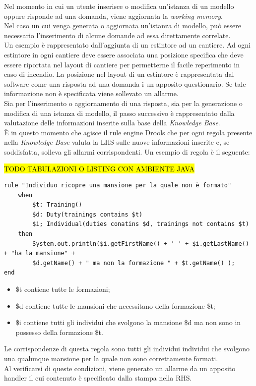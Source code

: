 Nel momento in cui un utente inserisce o modifica un'istanza di un modello oppure risponde ad una domanda, viene aggiornata la \textit{working memory}. \\
Nel caso un cui venga generata o aggiornata un'istanza di modello, può essere necessario l'inserimento di alcune domande ad essa direttamente correlate.\\
Un esempio è rappresentato dall'aggiunta di un estintore ad un cantiere. Ad ogni estintore in ogni cantiere deve essere associata una posizione specifica che deve essere riportata nel layout di cantiere per permetterne il facile reperimento in caso di incendio. La posizione nel layout di un estintore è rappresentata dal software come una risposta ad una domanda i un apposito questionario. Se tale informazione non è specificata viene sollevato un allarme.\\
Sia per l'inserimento o aggiornamento di una risposta, sia per la generazione o modifica di una istanza di modello, il passo successivo è rappresentato dalla valutazione delle informazioni inserite sulla base della \textit{Knowledge Base}. \\
È in questo momento che agisce il rule engine Drools che per ogni regola presente nella \textit{Knowledge Base} valuta la LHS sulle nuove informazioni inserite e, se soddisfatta, solleva gli allarmi corrispondenti. 
Un esempio di regola è il seguente:

\hl{TODO TABULAZIONI O LISTING CON AMBIENTE JAVA}
\begin{verbatim}
rule "Individuo ricopre una mansione per la quale non è formato"
	when
		$t: Training()
		$d: Duty(trainings contains $t)
		$i; Individual(duties conatins $d, trainings not contains $t)
	then
		System.out.println($i.getFirstName() + ' ' + $i.getLastName() + "ha la mansione" +
		$d.getName() + " ma non la formazione " + $t.getName() );
end
\end{verbatim}
\begin{itemize}
	\item \$t contiene tutte le formazioni;
	\item \$d contiene  tutte le mansioni che necessitano della formazione \$t;
	\item \$i contiene tutti gli individui che svolgono la mansione \$d ma non sono in possesso della formazione \$t.
\end{itemize}
Le corrispondenze di questa regola sono tutti gli individui individui che svolgono una qualunque mansione per la quale non sono correttamente formati.\\
Al verificarsi di queste condizioni, viene generato un allarme da un apposito handler il cui contenuto è specificato dalla stampa nella RHS.



